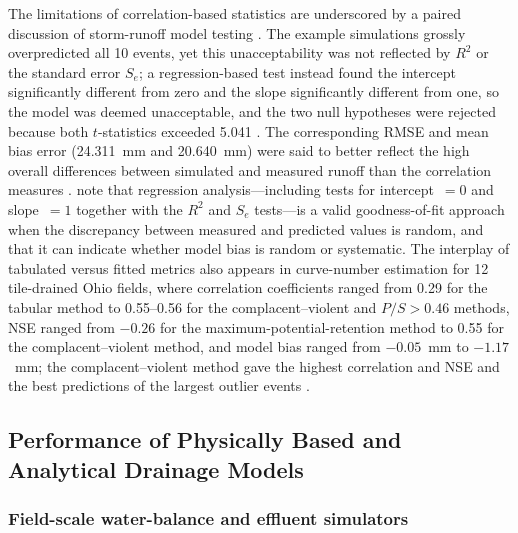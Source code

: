 \documentclass[11pt]{article}
\begin{document}
The limitations of correlation-based statistics are underscored by a paired
discussion of storm-runoff model testing \parencite{STONE1995,SAVABI1995}. The
example simulations grossly overpredicted all 10 events, yet this
unacceptability was not reflected by $R^2$ or the standard error $S_e$; a
regression-based test instead found the intercept significantly different from
zero and the slope significantly different from one, so the model was deemed
unacceptable, and the two null hypotheses were rejected because both
$t$-statistics exceeded 5.041 \parencite{STONE1995,SAVABI1995}. The
corresponding RMSE and mean bias error (24.311~mm and 20.640~mm) were said to
better reflect the high overall differences between simulated and measured
runoff than the correlation measures \parencite{STONE1995,SAVABI1995}.
\textcite{SAVABI1995} note that regression analysis---including tests for
intercept~$=0$ and slope~$=1$ together with the $R^2$ and $S_e$ tests---is a
valid goodness-of-fit approach when the discrepancy between measured and
predicted values is random, and that it can indicate whether model bias is
random or systematic. The interplay of tabulated versus fitted metrics also
appears in curve-number estimation for 12 tile-drained Ohio fields, where
correlation coefficients ranged from 0.29 for the tabular method to 0.55--0.56
for the complacent--violent and $P/S>0.46$ methods, NSE ranged from $-0.26$ for
the maximum-potential-retention method to 0.55 for the complacent--violent
method, and model bias ranged from $-0.05$~mm to $-1.17$~mm; the
complacent--violent method gave the highest correlation and NSE and the best
predictions of the largest outlier events \parencite{Wessel2022}.

\subsection{Performance of Physically Based and Analytical Drainage Models}

\subsubsection{Field-scale water-balance and effluent simulators}
\end{document}
